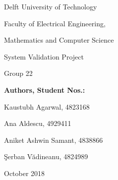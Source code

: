 \begin{titlepage}
	\begin{center}
		{\Large Delft University of Technology}
		\par\vspace*{2mm}
		{\Large Faculty of Electrical Engineering,
		
		        Mathematics and Computer Science}
		\par\vspace*{3mm}
		
		\par\vspace*{35mm}
		{\Huge System Validation Project}
		\par\vspace*{30mm}
		{\Large Group 22}
		\par\vspace*{3mm}
		\vspace*{1mm} \Large \textbf{\Large Authors, Student Nos.:}\vspace*{1mm} \\
		\par\vspace*{1mm}
		{\Large Kaustubh Agarwal, 4823168
		
		\Large Ana Aldescu, 4929411
		
        \Large Aniket Ashwin Samant, 4838866
        
        \Large Şerban Vădineanu, 4824989
        }

		\par\vspace*{60mm}
		\Large October 2018
	\end{center}
\end{titlepage}
